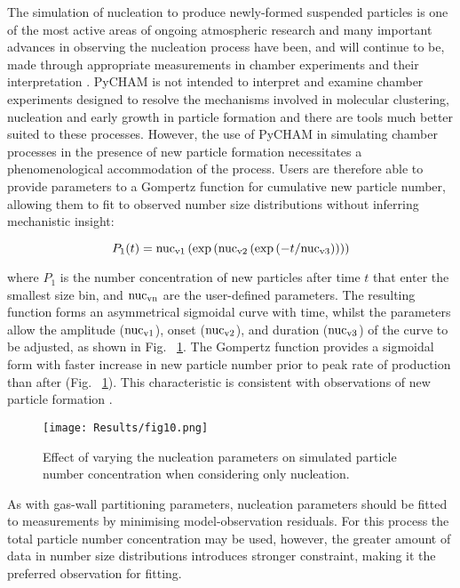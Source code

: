 \documentclass[gmd, manuscript]{copernicus}
\begin{document}
The simulation of nucleation to produce newly-formed suspended particles is one of the most active areas of ongoing atmospheric research and many important advances in observing the nucleation process have been, and will continue to be, made through appropriate measurements in chamber experiments and their interpretation \citep{Dada2020}.  PyCHAM is not intended to interpret and examine chamber experiments designed to resolve the mechanisms involved in molecular clustering, nucleation and early growth in particle formation and there are tools much better suited to these processes.  However, the use of PyCHAM in simulating chamber processes in the presence of new particle formation necessitates a phenomenological accommodation of the process.  Users are therefore able to provide parameters to a Gompertz function for cumulative new particle number, allowing them to fit to observed number size distributions without inferring mechanistic insight:

\begin{equation} \label{eq:Gompertz}
P_{1}(t) = \rm{nuc_{v1}}\left(\exp \left(\rm{nuc_{v2}}\left(\exp \left(\mit{-t}/\rm{nuc_{v3}} \right) \right) \right) \right)
\end{equation}

where $P_{1}$ is the number concentration of new particles after time $t$ that enter the smallest size bin, and $\rm{nuc_{vn}}$ are the user-defined parameters.  The resulting function forms an asymmetrical sigmoidal curve with time, whilst the parameters allow the amplitude ($\rm{nuc_{v1}}$), onset ($\rm{nuc_{v2}}$), and duration ($\rm{nuc_{v3}}$) of the curve to be adjusted, as shown in Fig. ~\ref{fig:nuc_sens}.  The Gompertz function provides a sigmoidal form with faster increase in new particle number prior to peak rate of production than after (Fig. ~\ref{fig:nuc_sens}).  This characteristic is consistent with observations of new particle formation \citep{Riccobono2014, Dada2020, Wang2020}.

\begin{figure}[t]
\texttt{[image: Results/fig10.png]}
\caption{Effect of varying the nucleation parameters on simulated particle number concentration when considering only nucleation.}
\label{fig:nuc_sens}
\end{figure}

As with gas-wall partitioning parameters, nucleation parameters should be fitted to measurements by minimising model-observation residuals.  For this process the total particle number concentration may be used, however, the greater amount of data in number size distributions introduces stronger constraint, making it the preferred observation for fitting.
\end{document}
